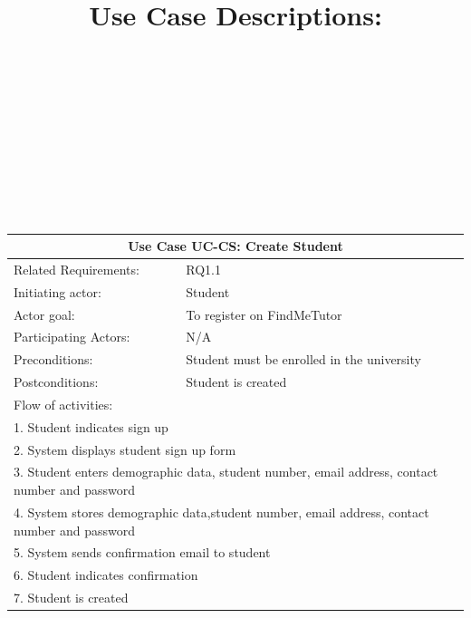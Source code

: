 \documentclass[12pt]{article}
\begin{document}
		{
		\\ \\ \\ \\ \\ \title{\textbf{Use Case Descriptions:}}\\ \\
		}
		{

		\centering



		\begin{tabular}{| l | l| }
			\hline\multicolumn{2}{|c|}{ \textbf{Use Case UC-CS: Create Student}} \\ \hline
			Related Requirements: & RQ1.1 \\ \hline
			Initiating actor: & Student \\ \hline
			Actor goal: & To register on FindMeTutor\\ \hline
			Participating Actors: &N/A\\ \hline
			Preconditions: & Student must be enrolled in the university\\ \hline
			Postconditions: & Student is created\\ \hline
			\multicolumn{2}{|l|}{Flow of activities:}\\ \hline
			\multicolumn{2}{|p{15cm}|}{1. Student indicates sign up}\\
			\multicolumn{2}{|p{15cm}|}{2. System displays student sign up form}\\
			\multicolumn{2}{|p{15cm}|}{3. Student enters demographic data, student number, email address, contact number and password}\\
			\multicolumn{2}{|p{15cm}|}{4. System stores demographic data,student number, email address, contact number and password}\\
			\multicolumn{2}{|l|}{5. System sends confirmation email to student}\\
			\multicolumn{2}{|l|}{6. Student indicates confirmation}	\\
			\multicolumn{2}{|l|}{7. Student is created}
			\\ \hline
			\end{tabular}



}
\end{document}

